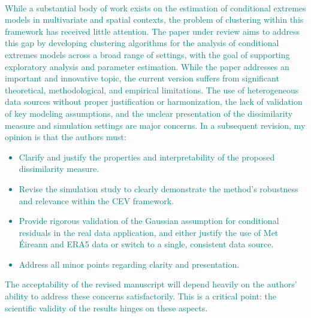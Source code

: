 \documentclass[a4paper,12pt]{article}
\begin{document}
\clearpage
\newpage

\\

\noindent \textcolor{teal}{
While a substantial body of work exists on the estimation of conditional extremes models in multivariate and spatial contexts, the problem of clustering within this framework has received little attention. 
The paper under review aims to address this gap by developing clustering algorithms for the analysis of conditional extremes models
across a broad range of settings, with the goal of supporting exploratory analysis and parameter estimation. 
While the paper addresses an important and innovative topic, the current version suffers from significant theoretical, methodological, and empirical limitations. 
The use of heterogeneous data sources without proper justification or harmonization, the lack of validation of key modeling assumptions, and the unclear presentation of the dissimilarity measure and simulation settings are major concerns. 
In a subsequent revision, my opinion is that the authors must:
\begin{itemize}
  \item Clarify and justify the properties and interpretability of the proposed dissimilarity measure.
  \item Revise the simulation study to clearly demonstrate the method’s robustness and relevance within the CEV framework.
  \item Provide rigorous validation of the Gaussian assumption for conditional residuals in the real data application, and either justify the use of Met Éireann and ERA5 data or switch to a single, consistent data source.
  \item Address all minor points regarding clarity and presentation.
\end{itemize}
The acceptability of the revised manuscript will depend heavily on the authors’ ability to address these concerns satisfactorily. 
This is a critical point: the scientific validity of the results hinges on
these aspects.
}
\end{document}
